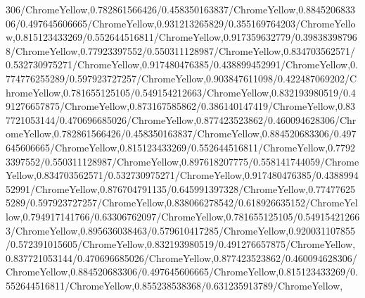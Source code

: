 {\begin{tikzternal}
{306/ChromeYellow,0.782861566426/0.458350163837/ChromeYellow,0.884520683306/0.497645606665/ChromeYellow,0.931213265829/0.355169764203/ChromeYellow,0.815123433269/0.552644516811/ChromeYellow,0.917359632779/0.398383987968/ChromeYellow,0.77923397552/0.550311128987/ChromeYellow,0.834703562571/0.532730975271/ChromeYellow,0.917480476385/0.438899452991/ChromeYellow,0.774776255289/0.597923727257/ChromeYellow,0.903847611098/0.422487069202/ChromeYellow,0.781655125105/0.549154212663/ChromeYellow,0.832193980519/0.491276657875/ChromeYellow,0.873167585862/0.386140147419/ChromeYellow,0.837721053144/0.470696685026/ChromeYellow,0.877423523862/0.460094628306/ChromeYellow,0.782861566426/0.458350163837/ChromeYellow,0.884520683306/0.497645606665/ChromeYellow,0.815123433269/0.552644516811/ChromeYellow,0.77923397552/0.550311128987/ChromeYellow,0.897618207775/0.558141744059/ChromeYellow,0.834703562571/0.532730975271/ChromeYellow,0.917480476385/0.438899452991/ChromeYellow,0.876704791135/0.645991397328/ChromeYellow,0.774776255289/0.597923727257/ChromeYellow,0.838066278542/0.618926635152/ChromeYellow,0.794917141766/0.63306762097/ChromeYellow,0.781655125105/0.549154212663/ChromeYellow,0.895636038463/0.579610417285/ChromeYellow,0.920031107855/0.572391015605/ChromeYellow,0.832193980519/0.491276657875/ChromeYellow,0.837721053144/0.470696685026/ChromeYellow,0.877423523862/0.460094628306/ChromeYellow,0.884520683306/0.497645606665/ChromeYellow,0.815123433269/0.552644516811/ChromeYellow,0.855238538368/0.631235913789/ChromeYellow,
}
\end{tikzternal}}

